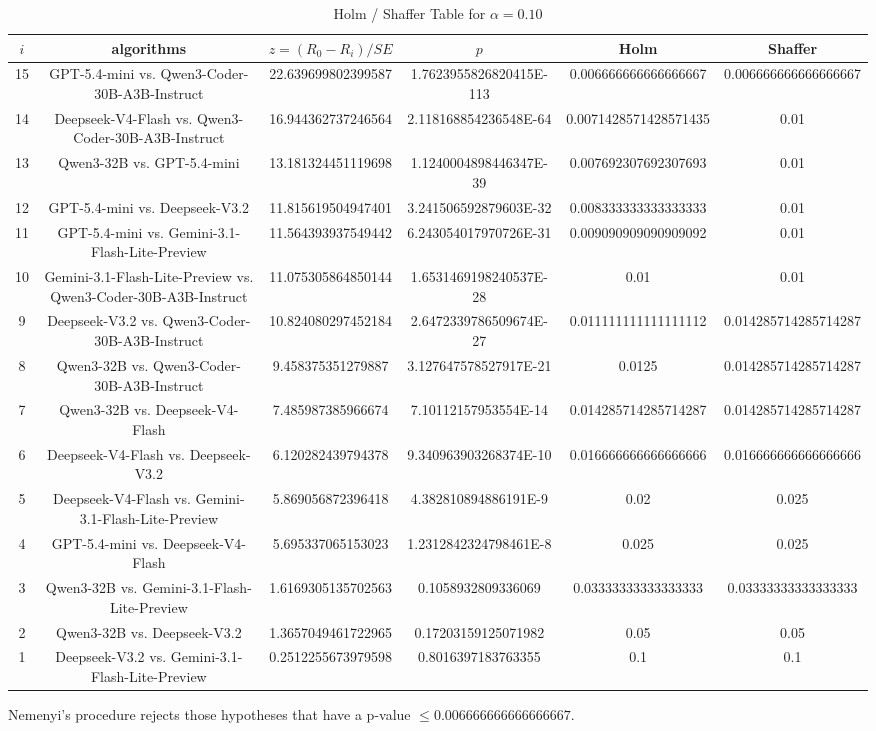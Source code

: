 \documentclass[a4paper,10pt]{article}
\begin{document}
\begin{landscape}
\begin{table}[!htp]
\centering\tiny
\caption{Holm / Shaffer Table for $\alpha=0.10$}
\begin{tabular}{cccccc}
$i$&algorithms&$z=(R_0 - R_i)/SE$&$p$&Holm&Shaffer\\
\hline
15&GPT-5.4-mini vs. Qwen3-Coder-30B-A3B-Instruct&22.639699802399587&1.7623955826820415E-113&0.006666666666666667&0.006666666666666667\\14&Deepseek-V4-Flash vs. Qwen3-Coder-30B-A3B-Instruct&16.944362737246564&2.118168854236548E-64&0.0071428571428571435&0.01\\13&Qwen3-32B vs. GPT-5.4-mini&13.181324451119698&1.1240004898446347E-39&0.007692307692307693&0.01\\12&GPT-5.4-mini vs. Deepseek-V3.2&11.815619504947401&3.241506592879603E-32&0.008333333333333333&0.01\\11&GPT-5.4-mini vs. Gemini-3.1-Flash-Lite-Preview&11.564393937549442&6.243054017970726E-31&0.009090909090909092&0.01\\10&Gemini-3.1-Flash-Lite-Preview vs. Qwen3-Coder-30B-A3B-Instruct&11.075305864850144&1.6531469198240537E-28&0.01&0.01\\9&Deepseek-V3.2 vs. Qwen3-Coder-30B-A3B-Instruct&10.824080297452184&2.6472339786509674E-27&0.011111111111111112&0.014285714285714287\\8&Qwen3-32B vs. Qwen3-Coder-30B-A3B-Instruct&9.458375351279887&3.127647578527917E-21&0.0125&0.014285714285714287\\7&Qwen3-32B vs. Deepseek-V4-Flash&7.485987385966674&7.10112157953554E-14&0.014285714285714287&0.014285714285714287\\6&Deepseek-V4-Flash vs. Deepseek-V3.2&6.120282439794378&9.340963903268374E-10&0.016666666666666666&0.016666666666666666\\5&Deepseek-V4-Flash vs. Gemini-3.1-Flash-Lite-Preview&5.869056872396418&4.382810894886191E-9&0.02&0.025\\4&GPT-5.4-mini vs. Deepseek-V4-Flash&5.695337065153023&1.2312842324798461E-8&0.025&0.025\\3&Qwen3-32B vs. Gemini-3.1-Flash-Lite-Preview&1.6169305135702563&0.1058932809336069&0.03333333333333333&0.03333333333333333\\2&Qwen3-32B vs. Deepseek-V3.2&1.3657049461722965&0.17203159125071982&0.05&0.05\\1&Deepseek-V3.2 vs. Gemini-3.1-Flash-Lite-Preview&0.2512255673979598&0.8016397183763355&0.1&0.1\\\hline
\end{tabular}
\end{table}
Nemenyi's procedure rejects those hypotheses that have a p-value $\le0.006666666666666667$.



\end{landscape}
\end{document}
